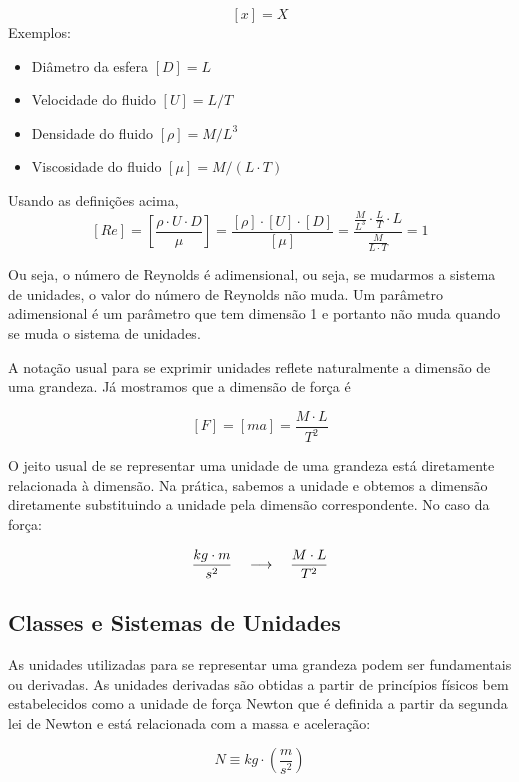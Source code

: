 \[
  [x] = X
\]
Exemplos:
\begin{itemize}
\item Diâmetro da esfera $[D] = L$
\item Velocidade do fluido $[U] = L/T$
\item Densidade do fluido $[\rho] = M / L^3$
\item Viscosidade do fluido $[\mu] = M / (L\cdot T)$
\end{itemize}

Usando as definições acima,
\[
  [Re] = \left[ \frac{\rho \cdot U \cdot D}{\mu} \right] = \frac{[\rho]\cdot[U]\cdot [D]}{[\mu]} = \frac{\frac{M}{L^3}\cdot\frac{L}{T}\cdot L}{\frac{M}{L\cdot T}} = 1
\]

Ou seja, o número de Reynolds é adimensional, ou seja, se mudarmos a sistema de unidades, o valor do número de Reynolds não muda. Um parâmetro adimensional é um parâmetro que tem dimensão 1 e portanto não muda quando se muda o sistema de unidades.

A notação usual para se exprimir unidades reflete naturalmente a dimensão de uma grandeza. Já mostramos que a dimensão de força é

\[
  [F] = [ma] = \frac{M\cdot L}{T^2}
\]
  
O jeito usual de se representar uma unidade de uma grandeza está diretamente relacionada à dimensão. Na prática, sabemos a unidade e obtemos a dimensão diretamente substituindo a unidade pela dimensão correspondente. No caso da força:

\[
\frac{kg\cdot m}{s^2} \quad\longrightarrow\quad \frac{M\cdot L}{T^2}
\]
    
  
\subsection{Classes e Sistemas de Unidades}

As unidades utilizadas para se representar uma grandeza podem ser fundamentais ou derivadas. As unidades derivadas são obtidas a partir de princípios físicos bem estabelecidos como a unidade de força Newton que é definida a partir da segunda lei de Newton e está relacionada com a massa e aceleração:

\[
N \equiv kg \cdot\left(\frac{m}{s^2}\right)
\]

